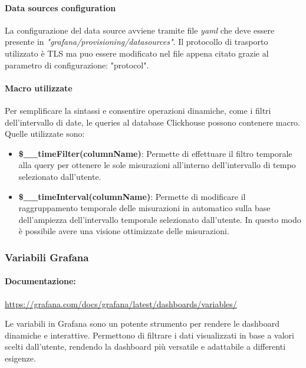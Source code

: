 \paragraph{Data sources configuration}
La configurazione del data source avviene tramite file \textit{yaml} che deve essere presente in \textit{"grafana/provisioning/datasources"}.
Il protocollo di trasporto utilizzato è TLS ma puo essere modificato nel file appena citato grazie al parametro di configurazione: "protocol".

\paragraph{Macro utilizzate}\label{sec:macros}
Per semplificare la sintassi e consentire operazioni dinamiche, come i filtri dell'intervallo di date, le queries al database Clickhouse possono contenere macro.
Quelle utilizzate sono:
\begin{itemize}
    \item \textbf{\$\_\_timeFilter(columnName)}: Permette di effettuare il filtro temporale alla query per ottenere le sole misurazioni all'interno dell'intervallo di tempo selezionato dall'utente.
    \item  \textbf{\$\_\_timeInterval(columnName)}: Permette di modificare il raggruppamento temporale delle misurazioni in automatico sulla base dell'ampiezza dell'intervallo temporale selezionato dall'utente.
    In questo modo è possibile avere una visione ottimizzate delle misurazioni.
\end{itemize}

\subsubsection{Variabili Grafana}
\paragraph*{Documentazione:} \href{https://grafana.com/docs/grafana/latest/dashboards/variables/}{https://grafana.com/docs/grafana/latest/dashboards/variables/}


 Le variabili in Grafana sono un potente strumento per rendere le dashboard dinamiche e interattive. Permettono di filtrare i dati visualizzati in base a valori scelti dall'utente, rendendo la dashboard più versatile e adattabile a differenti esigenze.
